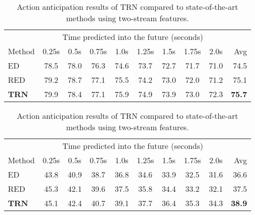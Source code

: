 \begin{table}
    \footnotesize
    \centering
    \begin{subtable}[t]{\linewidth}
        \centering
        \begin{tabular}
            {l@{\;}@{\;}c@{\;}@{\;}c@{\;}@{\;}c@{\;}@{\;}c@{\;}@{\;}c@{\;}@{\;}c@{\;}@{\;}c@{\;}@{\;}c@{\;}@{\,}r@{\;\;\;}}
            \toprule
            & \multicolumn{8}{c}{Time predicted into the future (seconds)} & \\
            \cmidrule{2-9}            Method & 0.25s & 0.5s & 0.75s & 1.0s & 1.25s & 1.5s & 1.75s & 2.0s & \;\;\;\;Avg \\
            \midrule
            {ED~\cite{gao2017red}} & 78.5 & 78.0 & 76.3 & 74.6 & 73.7 & 72.7 & 71.7 & 71.0 & 74.5 \\
            {RED~\cite{gao2017red}} & 79.2 & 78.7 & 77.1 & 75.5 & 74.2 & 73.0 & 72.0 & 71.2 & 75.1 \\
            \textbf{TRN} & 79.9 & 78.4 & 77.1 & 75.9 & 74.9 & 73.9 & 73.0 & 72.3 &\textbf{75.7} \\
            \bottomrule
        \end{tabular}
        \vspace{-3pt}
        \caption{
            Results on TVSeries dataset in terms of \textit{cAP} (\%).
        }
        \vspace{3pt}
    \end{subtable}
    \begin{subtable}[t]{\linewidth}
        \centering
        \begin{tabular}
            {l@{\;}@{\;}c@{\;}@{\;}c@{\;}@{\;}c@{\;}@{\;}c@{\;}@{\;}c@{\;}@{\;}c@{\;}@{\;}c@{\;}@{\;}c@{\;}@{\,}r@{\;\;\;}}
            \toprule
            & \multicolumn{8}{c}{Time predicted into the future (seconds)} & \\
            \cmidrule{2-9}            Method & 0.25s & 0.5s & 0.75s & 1.0s & 1.25s & 1.5s & 1.75s & 2.0s & \;\;\;\;Avg \\
            \midrule
            {ED~\cite{gao2017red}} & 43.8 & 40.9 & 38.7 & 36.8 & 34.6 & 33.9 & 32.5 & 31.6 & 36.6 \\
            {RED~\cite{gao2017red}} & 45.3 & 42.1 & 39.6 & 37.5 & 35.8 & 34.4 & 33.2 & 32.1 & 37.5 \\
            \textbf{TRN} & 45.1 & 42.4 & 40.7 & 39.1 & 37.7 & 36.4 & 35.3 & 34.3 &\textbf{38.9} \\
            \bottomrule
        \end{tabular}
        \vspace{-3pt}
        \caption{
            Results on THUMOS'14 dataset in terms of \textit{mAP} (\%).
        }        
        \vspace{3pt}
    \end{subtable}
    \vspace{-10pt}
    \caption{
        Action anticipation results of TRN compared to state-of-the-art
        methods using two-stream features.
    }
    \vspace{-5pt} 
    \label{table:anticipation}
\end{table}

